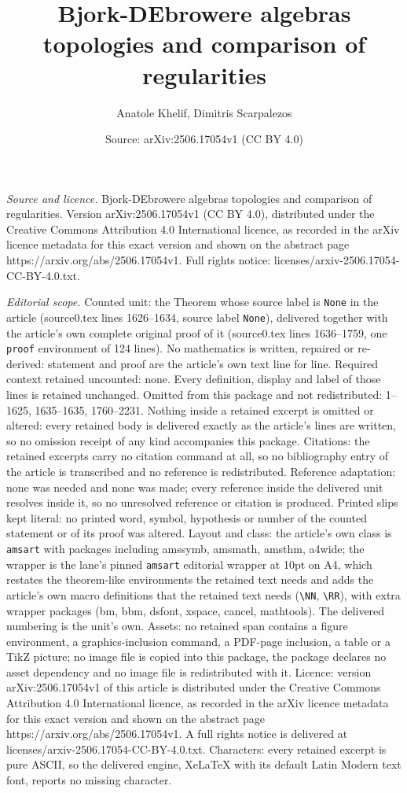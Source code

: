 \documentclass[10pt,a4paper]{amsart}
\title[Bjork-DEbrowere algebras topologies and comparison of regula]{Bjork-DEbrowere algebras topologies and comparison of regularities}
\author{Anatole Khelif, Dimitris Scarpalezos}
\date{Source: arXiv:2506.17054v1 (CC BY 4.0)}
\begin{document}
\maketitle

\noindent\emph{Source and licence.} Bjork-DEbrowere algebras topologies and comparison of regularities. Version arXiv:2506.17054v1 (CC BY 4.0), distributed under the Creative Commons Attribution 4.0 International licence, as recorded in the arXiv licence metadata for this exact version and shown on the abstract page https://arxiv.org/abs/2506.17054v1. Full rights notice: licenses/arxiv-2506.17054-CC-BY-4.0.txt.\par\smallskip

\noindent\textit{Editorial scope.} Counted unit: the Theorem whose source label is \texttt{None} in the article (source0.tex lines 1626--1634, source label \texttt{None}), delivered together with the article's own complete original proof of it (source0.tex lines 1636--1759, one \texttt{proof} environment of 124 lines). No mathematics is written, repaired or re-derived: statement and proof are the article's own text line for line. Required context retained uncounted: none. Every definition, display and label of those lines is retained unchanged. Omitted from this package and not redistributed: 1--1625, 1635--1635, 1760--2231. Nothing inside a retained excerpt is omitted or altered: every retained body is delivered exactly as the article's lines are written, so no omission receipt of any kind accompanies this package. Citations: the retained excerpts carry no citation command at all, so no bibliography entry of the article is transcribed and no reference is redistributed. Reference adaptation: none was needed and none was made; every reference inside the delivered unit resolves inside it, so no unresolved reference or citation is produced. Printed slips kept literal: no printed word, symbol, hypothesis or number of the counted statement or of its proof was altered. Layout and class: the article's own class is \texttt{amsart} with packages including amssymb, amsmath, amsthm, a4wide; the wrapper is the lane's pinned \texttt{amsart} editorial wrapper at 10pt on A4, which restates the theorem-like environments the retained text needs and adds the article's own macro definitions that the retained text needs (\texttt{\textbackslash NN}, \texttt{\textbackslash RR}), with extra wrapper packages (bm, bbm, dsfont, xspace, cancel, mathtools). The delivered numbering is the unit's own. Assets: no retained span contains a figure environment, a graphics-inclusion command, a PDF-page inclusion, a table or a TikZ picture; no image file is copied into this package, the package declares no asset dependency and no image file is redistributed with it. Licence: version arXiv:2506.17054v1 of this article is distributed under the Creative Commons Attribution 4.0 International licence, as recorded in the arXiv licence metadata for this exact version and shown on the abstract page https://arxiv.org/abs/2506.17054v1. A full rights notice is delivered at licenses/arxiv-2506.17054-CC-BY-4.0.txt. Characters: every retained excerpt is pure ASCII, so the delivered engine, XeLaTeX with its default Latin Modern text font, reports no missing character.
\end{document}
